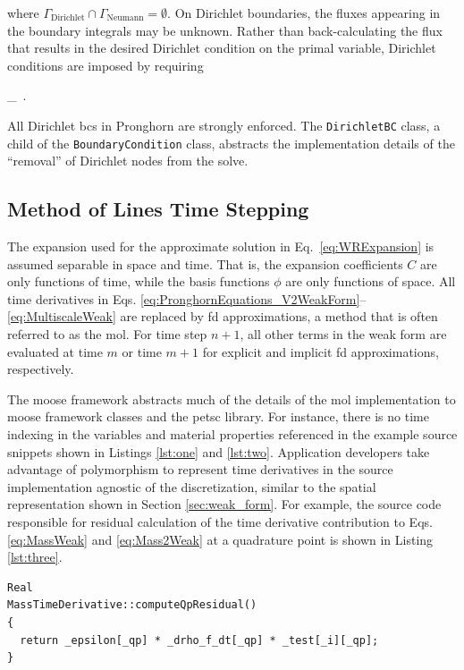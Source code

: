 \noindent where \(\Gamma_\text{Dirichlet}\cap\Gamma_\text{Neumann}=\emptyset\). On Dirichlet boundaries, the fluxes appearing in the boundary integrals may be unknown. Rather than back-calculating the flux that results in the desired Dirichlet condition on the primal variable, Dirichlet conditions are imposed by requiring

\beq
{}\Gamma\in\Gamma_\ .
\eeq

\noindent All Dirichlet \glspl{bc} in Pronghorn are strongly enforced. The \texttt{DirichletBC} class, a child of the \texttt{BoundaryCondition} class, abstracts the implementation details of the ``removal'' of Dirichlet nodes from the solve.

\subsection{Method of Lines Time Stepping}
\label{sec:mol}

The expansion used for the approximate solution in Eq.\ \eqref{eq:WRExpansion} is assumed separable in space and time. That is, the expansion coefficients \(C\) are only functions of time, while the basis functions \(\phi\) are only functions of space. All time derivatives in Eqs. \eqref{eq:PronghornEquations_V2WeakForm}--\eqref{eq:MultiscaleWeak} are replaced by \gls{fd} approximations, a method that is often referred to as the \gls{mol}. For time step \(n+1\), all other terms in the weak form are evaluated at time \(m\) or time \(m+1\) for explicit and implicit \gls{fd} approximations, respectively.

The \gls{moose} framework abstracts much of the details of the \gls{mol} implementation to \gls{moose} framework classes and the \gls{petsc} library. For instance, there is no time indexing in the variables and material properties referenced in the example source snippets shown in Listings \ref{lst:one} and \ref{lst:two}. Application developers take advantage of polymorphism to represent time derivatives in the source implementation agnostic of the discretization, similar to the spatial representation shown in Section \ref{sec:weak_form}. For example, the source code responsible for residual calculation of the time derivative contribution to Eqs. \eqref{eq:MassWeak} and \eqref{eq:Mass2Weak} at a quadrature point is shown in Listing \ref{lst:three}.

\vspace{1em}
\begin{minipage}[c]{0.92\linewidth}
\begin{lstlisting}[caption={Pronghorn source code calculation of \(\int_\Omega\epsilon\frac{\partial\rho_f}{\partial t}\psi d\Omega\).},captionpos=b,label={lst:three}]
Real
MassTimeDerivative::computeQpResidual()
{
  return _epsilon[_qp] * _drho_f_dt[_qp] * _test[_i][_qp];
}
\end{lstlisting}
\end{minipage}

